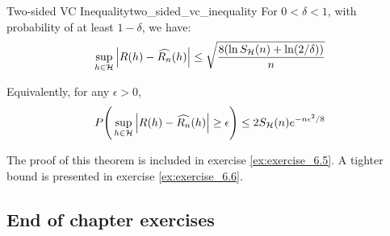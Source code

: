 \begin{theorem}{Two-sided VC Inequality}{two_sided_vc_inequality}
    For $0<\delta<1$, with probability of at least $1-\delta$, we have:
    \begin{align*}
        \sup_{h\in\mathcal{H}} \Big| 
            R(h) - \widehat{R_n}(h)
         \Big| \le \sqrt{
            \frac{8(\ln S_{\mathcal{H}}(n) + \ln(2/\delta))}{n}
        }
    \end{align*}

    \noindent Equivalently, for any $\epsilon>0$, 
    \begin{align*}
        P\Bigg( 
            \sup_{h\in\mathcal{H}} \Big| 
                R(h) - \widehat{R_n}(h)
             \Big|\ge \epsilon
         \Bigg)\le 2S_{\mathcal{H}}(n)e^{-n\epsilon^2/8}
    \end{align*}
\end{theorem}

\begin{proof*}
    The proof of this theorem is included in exercise \ref{ex:exercise_6.5}. A tighter bound is presented in exercise \ref{ex:exercise_6.6}.
\end{proof*}


















\newpage
\subsection{End of chapter exercises}
